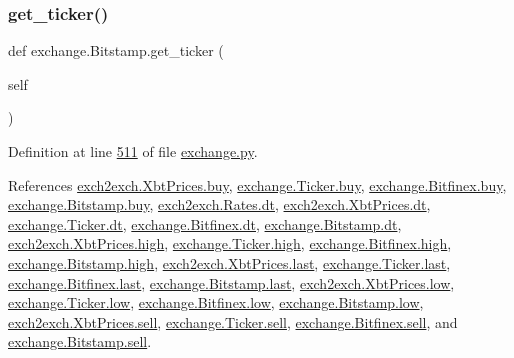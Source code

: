 \subsubsection{\texorpdfstring{get\+\_\+ticker()}{get\_ticker()}}
{\footnotesize\ttfamily def exchange.\+Bitstamp.\+get\+\_\+ticker (\begin{DoxyParamCaption}\item[{}]{self }\end{DoxyParamCaption})}



Definition at line \hyperlink{exchange_8py_source_l00511}{511} of file \hyperlink{exchange_8py_source}{exchange.\+py}.



References \hyperlink{exch2exch_8py_source_l00059}{exch2exch.\+Xbt\+Prices.\+buy}, \hyperlink{exchange_8py_source_l00060}{exchange.\+Ticker.\+buy}, \hyperlink{exchange_8py_source_l00430}{exchange.\+Bitfinex.\+buy}, \hyperlink{exchange_8py_source_l00502}{exchange.\+Bitstamp.\+buy}, \hyperlink{exch2exch_8py_source_l00028}{exch2exch.\+Rates.\+dt}, \hyperlink{exch2exch_8py_source_l00057}{exch2exch.\+Xbt\+Prices.\+dt}, \hyperlink{exchange_8py_source_l00059}{exchange.\+Ticker.\+dt}, \hyperlink{exchange_8py_source_l00437}{exchange.\+Bitfinex.\+dt}, \hyperlink{exchange_8py_source_l00509}{exchange.\+Bitstamp.\+dt}, \hyperlink{exch2exch_8py_source_l00061}{exch2exch.\+Xbt\+Prices.\+high}, \hyperlink{exchange_8py_source_l00062}{exchange.\+Ticker.\+high}, \hyperlink{exchange_8py_source_l00432}{exchange.\+Bitfinex.\+high}, \hyperlink{exchange_8py_source_l00504}{exchange.\+Bitstamp.\+high}, \hyperlink{exch2exch_8py_source_l00063}{exch2exch.\+Xbt\+Prices.\+last}, \hyperlink{exchange_8py_source_l00064}{exchange.\+Ticker.\+last}, \hyperlink{exchange_8py_source_l00434}{exchange.\+Bitfinex.\+last}, \hyperlink{exchange_8py_source_l00506}{exchange.\+Bitstamp.\+last}, \hyperlink{exch2exch_8py_source_l00062}{exch2exch.\+Xbt\+Prices.\+low}, \hyperlink{exchange_8py_source_l00063}{exchange.\+Ticker.\+low}, \hyperlink{exchange_8py_source_l00433}{exchange.\+Bitfinex.\+low}, \hyperlink{exchange_8py_source_l00505}{exchange.\+Bitstamp.\+low}, \hyperlink{exch2exch_8py_source_l00058}{exch2exch.\+Xbt\+Prices.\+sell}, \hyperlink{exchange_8py_source_l00061}{exchange.\+Ticker.\+sell}, \hyperlink{exchange_8py_source_l00431}{exchange.\+Bitfinex.\+sell}, and \hyperlink{exchange_8py_source_l00503}{exchange.\+Bitstamp.\+sell}.


